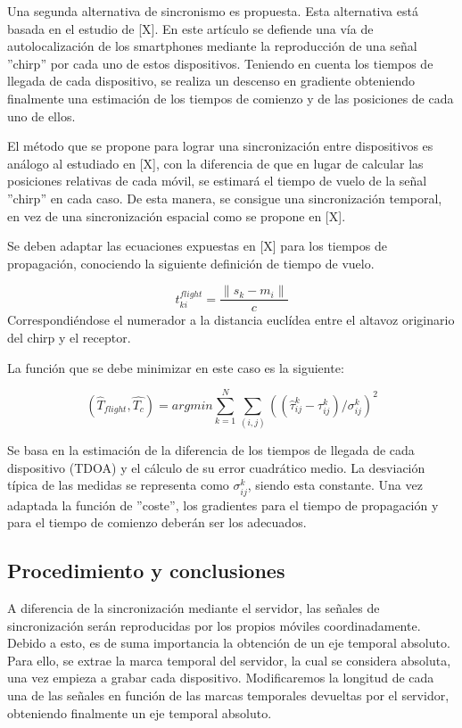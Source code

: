 \documentclass[a4paper,11pt]{book}
\begin{document}
Una segunda alternativa de sincronismo es propuesta. Esta alternativa está basada en el estudio de [X]. En este artículo se defiende una vía de autolocalización de los smartphones mediante la reproducción de una señal ''chirp'' por cada uno de estos dispositivos. Teniendo en cuenta los tiempos de llegada de cada dispositivo, se realiza un descenso en gradiente obteniendo finalmente una estimación de los tiempos de comienzo y de las posiciones de cada uno de ellos.

El método que se propone para lograr una sincronización entre dispositivos es análogo al estudiado en [X], con la diferencia de que en lugar de calcular las posiciones relativas de cada móvil, se estimará el tiempo de vuelo de la señal ''chirp'' en cada caso. De esta manera, se consigue una sincronización temporal, en vez de una sincronización espacial como se propone en [X].

Se deben adaptar las ecuaciones expuestas en [X] para los tiempos de propagación, conociendo la siguiente definición de tiempo de vuelo.

\begin{equation}
t_{ki}^{flight} = \frac{\|s_{k} - m_{i} \|}{c}
\end{equation}
Correspondiéndose el numerador a la distancia euclídea entre el altavoz originario del chirp y el receptor.

La función que se debe minimizar en este caso es la siguiente:

\begin{equation}
(\hat{T}_{flight}, \hat{T_{c}}) = argmin \sum_{k=1}^N \sum_{(i,j)} ((\hat{\tau}_{ij}^k - \tau_{ij}^k) / \sigma_{ij}^k) ^2
\end{equation}

Se basa en la estimación de la diferencia de los tiempos de llegada de cada dispositivo (TDOA) y el cálculo de su error cuadrático medio. La desviación típica de las medidas se representa como $\sigma_{ij}^k$, siendo esta constante. Una vez adaptada la función de ''coste'', los gradientes para el tiempo de propagación y para el tiempo de comienzo deberán ser los adecuados.

\subsection{Procedimiento y conclusiones}
A diferencia de la sincronización mediante el servidor, las señales de sincronización serán reproducidas por los propios móviles coordinadamente. Debido a esto, es de suma importancia la obtención de un eje temporal absoluto. Para ello, se extrae la marca temporal del servidor, la cual se considera absoluta, una vez empieza a grabar cada dispositivo. Modificaremos la longitud de cada una de las señales en función de las marcas temporales devueltas por el servidor, obteniendo finalmente un eje temporal absoluto.
\end{document}
